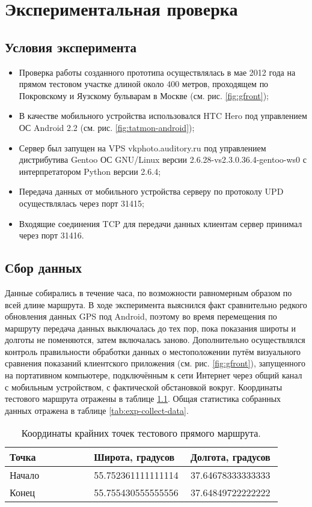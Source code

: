 \chapter{Экспериментальная проверка}

\section{Условия эксперимента}
\begin{itemize}
	\item
		Проверка работы созданного прототипа осуществлялась в мае 2012 года на прямом тестовом участке длиной около 400 метров, проходящем по Покровскому и Яузскому бульварам в Москве (см. рис. \ref{fig:gfront});
	\item
		В качестве мобильного устройства использовался HTC Hero под управлением ОС Android 2.2 (см. рис. \ref{fig:tatmon-android});
	\item
		Сервер был запущен на VPS vkphoto.auditory.ru под управлением дистрибутива Gentoo ОС GNU/Linux версии 2.6.28-vs2.3.0.36.4-gentoo-ws0 с интерпретатором Python версии 2.6.4;
	\item
		Передача данных от мобильного устройства серверу по протоколу UPD осуществлялась через порт 31415;
	\item
		Входящие соединения TCP для передачи данных клиентам сервер принимал через порт 31416.
\end{itemize}

\section{Сбор данных}
Данные собирались в течение часа, по возможности равномерным образом по всей длине маршрута. В ходе эксперимента выяснился факт сравнительно редкого обновления данных GPS под Android, поэтому во время перемещения по маршруту передача данных выключалась до тех пор, пока показания широты и долготы не поменяются, затем включалась заново. Дополнительно осуществлялся контроль правильности обработки данных о местоположении путём визуального сравнения показаний клиентского приложения (см. рис. \ref{fig:gfront}), запущенного на портативном компьютере, подключённым к сети Интернет через общий канал с мобильным устройством, с фактической обстановкой вокруг. Координаты тестового маршрута отражены в таблице \ref{tab:exp-route-begend}. Общая статистика собранных данных отражена в таблице \ref{tab:exp-collect-data}.
\begin{table}
	\caption{\label{tab:exp-route-begend}Координаты крайних точек тестового прямого маршрута.}
	\begin{center}
		\begin{tabular}{|p{0.3\linewidth}|p{0.3\linewidth}|p{0.3\linewidth}|}
			\hline
			Точка & Широта, градусов & Долгота, градусов \\
			\hline
			Начало & 55.752361111111114 & 37.64678333333333 \\
			\hline
			Конец & 55.755430555555556 & 37.64849722222222 \\
			\hline
		\end{tabular}
	\end{center}
\end{table}

